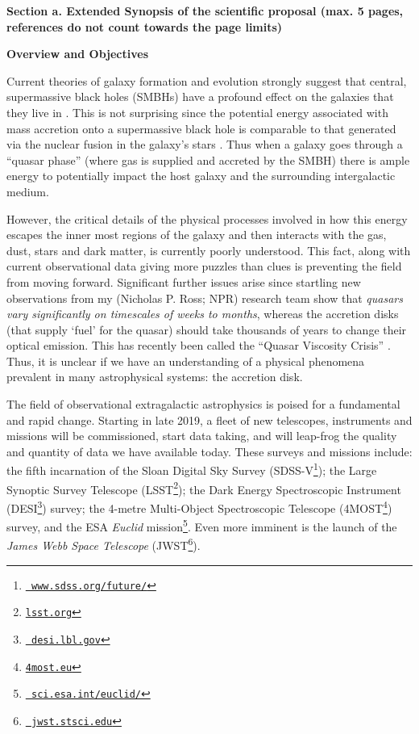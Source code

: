 \documentclass[oneside, a4paper, onecolumn, 11pt]{article}
\begin{document}
\vspace{-16pt}

\smallskip
\smallskip
\noindent
{\bf{\textcolor{Cerulean}{Section a. Extended Synopsis of the scientific proposal (max. 5 pages, references do not count towards the page limits)
}}} 
\vspace{6pt}

\noindent
\large
{\bf{\textcolor{Cerulean}{Overview and Objectives}}}
\normalsize

\noindent
Current theories of galaxy formation and evolution strongly suggest
that central, supermassive black holes (SMBHs) have a profound effect
on the galaxies that they live in \citep[e.g., ][]{KormendyHo2013}.
This is not surprising since the potential energy associated with mass
accretion onto a supermassive black hole is comparable to that
generated via the nuclear fusion in the galaxy's stars \citep[see
e.g. ][]{Fabian2012}. Thus when a galaxy goes through a ``quasar
phase'' (where gas is supplied and accreted by the SMBH) there is
ample energy to potentially impact the host galaxy and the surrounding
intergalactic medium.

\smallskip
\smallskip
\noindent
However, the critical details of the physical processes involved in
how this energy escapes the inner most regions of the galaxy and then
interacts with the gas, dust, stars and dark matter, is currently
poorly understood. This fact, along with current observational data
giving more puzzles than clues is preventing the field from moving
forward. Significant further issues arise since startling new
observations from my (Nicholas P. Ross; NPR) research team
\citep{MacLeod2016, Ross2018} show that {\it quasars vary
significantly on timescales of weeks to months}, whereas the accretion
disks (that supply `fuel' for the quasar) should take thousands of
years to change their optical emission. This has recently been called
the ``Quasar Viscosity Crisis'' \citep[e.g., ][]{Lawrence2018}. Thus,
it is unclear if we have an understanding of a physical phenomena
prevalent in many astrophysical systems: the accretion disk.

\smallskip
\smallskip
\noindent
The field of observational extragalactic astrophysics is poised for a
fundamental and rapid change. Starting in late 2019, a fleet of new
telescopes, instruments and missions will be commissioned, start data
taking, and will leap-frog the quality and quantity of data we have
available today. These surveys and missions include: the fifth
incarnation of the Sloan Digital Sky Survey
(SDSS-V\footnote{\href{www.sdss.org/future/}{{\tt
www.sdss.org/future/}}}); the Large Synoptic Survey Telescope
(LSST\footnote{\href{lsst.org}{{\tt lsst.org}}}); the Dark Energy
Spectroscopic Instrument (DESI\footnote{\href{desi.lbl.gov}{{\tt
desi.lbl.gov}}}) survey; the 4-metre Multi-Object Spectroscopic
Telescope (4MOST\footnote{\href{4most.eu}{{\tt 4most.eu}}}) survey,
and the ESA {\it Euclid}
mission\footnote{\href{sci.esa.int/euclid/}{{\tt
sci.esa.int/euclid/}}}. Even more imminent is the launch of the {\it
James Webb Space Telescope} (JWST\footnote{\href{jwst.stsci.edu}{{\tt
jwst.stsci.edu}}}).
\end{document}
